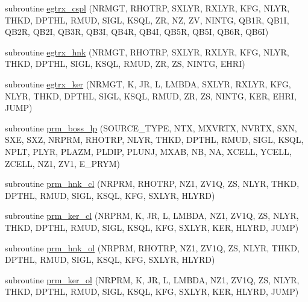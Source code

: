 \begin{DoxyCompactItemize}
\item 
subroutine \hyperlink{Leroi_8f90_a10fd9ada0ec15151a8112666c09a245d}{egtrx\+\_\+cspl} (N\+R\+M\+GT, R\+H\+O\+T\+RP, S\+X\+L\+YR, R\+X\+L\+YR, K\+FG, N\+L\+YR, T\+H\+KD, D\+P\+T\+HL, R\+M\+UD, S\+I\+GL, K\+S\+QL, ZR, NZ, ZV, N\+I\+N\+TG, Q\+B1R, Q\+B1I, Q\+B2R, Q\+B2I, Q\+B3R, Q\+B3I, Q\+B4R, Q\+B4I, Q\+B5R, Q\+B5I, Q\+B6R, Q\+B6I)
\item 
subroutine \hyperlink{Leroi_8f90_a5489646b1d19d3a2a814c56265bd78fb}{egtrx\+\_\+hnk} (N\+R\+M\+GT, R\+H\+O\+T\+RP, S\+X\+L\+YR, R\+X\+L\+YR, K\+FG, N\+L\+YR, T\+H\+KD, D\+P\+T\+HL, S\+I\+GL, K\+S\+QL, R\+M\+UD, ZR, ZS, N\+I\+N\+TG, E\+H\+RI)
\item 
subroutine \hyperlink{Leroi_8f90_aed79c3eb3332f2cd1b4c25c6c825e360}{egtrx\+\_\+ker} (N\+R\+M\+GT, K, JR, L, L\+M\+B\+DA, S\+X\+L\+YR, R\+X\+L\+YR, K\+FG, N\+L\+YR, T\+H\+KD, D\+P\+T\+HL, S\+I\+GL, K\+S\+QL, R\+M\+UD, ZR, ZS, N\+I\+N\+TG, K\+ER, E\+H\+RI, J\+U\+MP)
\item 
subroutine \hyperlink{Leroi_8f90_ae4548433d1a40c9ae5dce4d7404c9404}{prm\+\_\+boss\+\_\+lp} (S\+O\+U\+R\+C\+E\+\_\+\+T\+Y\+PE, N\+TX, M\+X\+V\+R\+TX, N\+V\+R\+TX, S\+XN, S\+XE, S\+XZ, N\+R\+P\+RM, R\+H\+O\+T\+RP, N\+L\+YR, T\+H\+KD, D\+P\+T\+HL, R\+M\+UD, S\+I\+GL, K\+S\+QL, N\+P\+LT, P\+L\+YR, P\+L\+A\+ZM, P\+L\+D\+IP, P\+L\+U\+NJ, M\+X\+AB, NB, NA, X\+C\+E\+LL, Y\+C\+E\+LL, Z\+C\+E\+LL, N\+Z1, Z\+V1, E\+\_\+\+P\+R\+YM)
\item 
subroutine \hyperlink{Leroi_8f90_a677c57fa23bac760da7b8f845b3f9f9d}{prm\+\_\+hnk\+\_\+cl} (N\+R\+P\+RM, R\+H\+O\+T\+RP, N\+Z1, Z\+V1Q, ZS, N\+L\+YR, T\+H\+KD, D\+P\+T\+HL, R\+M\+UD, S\+I\+GL, K\+S\+QL, K\+FG, S\+X\+L\+YR, H\+L\+Y\+RD)
\item 
subroutine \hyperlink{Leroi_8f90_a04185f4ba85efc3e493f2de9019a69da}{prm\+\_\+ker\+\_\+cl} (N\+R\+P\+RM, K, JR, L, L\+M\+B\+DA, N\+Z1, Z\+V1Q, ZS, N\+L\+YR, T\+H\+KD, D\+P\+T\+HL, R\+M\+UD, S\+I\+GL, K\+S\+QL, K\+FG, S\+X\+L\+YR, K\+ER, H\+L\+Y\+RD, J\+U\+MP)
\item 
subroutine \hyperlink{Leroi_8f90_a89b4321e05fd2190aba745c6eec86645}{prm\+\_\+hnk\+\_\+ol} (N\+R\+P\+RM, R\+H\+O\+T\+RP, N\+Z1, Z\+V1Q, ZS, N\+L\+YR, T\+H\+KD, D\+P\+T\+HL, R\+M\+UD, S\+I\+GL, K\+S\+QL, K\+FG, S\+X\+L\+YR, H\+L\+Y\+RD)
\item 
subroutine \hyperlink{Leroi_8f90_a5a775b5fbe7ca4b27ec968d5efde2795}{prm\+\_\+ker\+\_\+ol} (N\+R\+P\+RM, K, JR, L, L\+M\+B\+DA, N\+Z1, Z\+V1Q, ZS, N\+L\+YR, T\+H\+KD, D\+P\+T\+HL, R\+M\+UD, S\+I\+GL, K\+S\+QL, K\+FG, S\+X\+L\+YR, K\+ER, H\+L\+Y\+RD, J\+U\+MP)

\end{DoxyCompactItemize}
